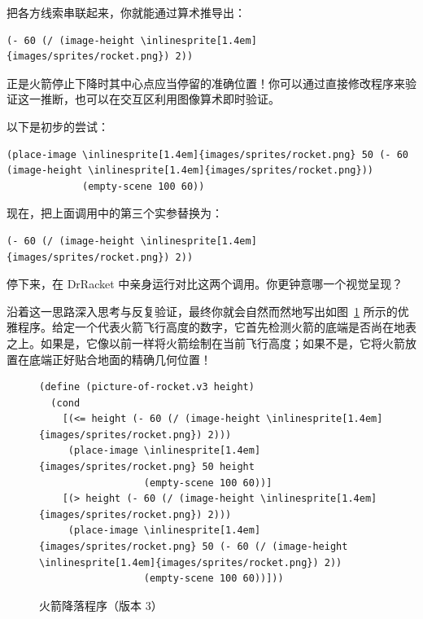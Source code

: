把各方线索串联起来，你就能通过算术推导出：

\begin{stepperbox}
\begin{Verbatim}[commandchars=\\\{\}, fontsize=\footnotesize]
(- 60 (/ (image-height \inlinesprite[1.4em]{images/sprites/rocket.png}) 2))
\end{Verbatim}
\end{stepperbox}

正是火箭停止下降时其中心点应当停留的准确位置！你可以通过直接修改程序来验证这一推断，也可以在交互区利用图像算术即时验证。

以下是初步的尝试：

\begin{stepperbox}
\begin{Verbatim}[commandchars=\\\{\}, fontsize=\footnotesize]
(place-image \inlinesprite[1.4em]{images/sprites/rocket.png} 50 (- 60 (image-height \inlinesprite[1.4em]{images/sprites/rocket.png}))
             (empty-scene 100 60))
\end{Verbatim}
\end{stepperbox}

现在，把上面调用中的第三个实参替换为：

\begin{stepperbox}
\begin{Verbatim}[commandchars=\\\{\}, fontsize=\footnotesize]
(- 60 (/ (image-height \inlinesprite[1.4em]{images/sprites/rocket.png}) 2))
\end{Verbatim}
\end{stepperbox}

\begin{notebox}[动手实验]
停下来，在 DrRacket 中亲身运行对比这两个调用。你更钟意哪一个视觉呈现？
\end{notebox}

沿着这一思路深入思考与反复验证，最终你就会自然而然地写出如图~\ref{fig:rocket_v3} 所示的优雅程序。给定一个代表火箭飞行高度的数字，它首先检测火箭的底端是否尚在地表之上。如果是，它像以前一样将火箭绘制在当前飞行高度；如果不是，它将火箭放置在底端正好贴合地面的精确几何位置！

\begin{figure}[htbp]
  \centering
\begin{stepperbox}[unbreakable]
\begin{Verbatim}[commandchars=\\\{\}, fontsize=\scriptsize]
(define (picture-of-rocket.v3 height)
  (cond
    [(<= height (- 60 (/ (image-height \inlinesprite[1.4em]{images/sprites/rocket.png}) 2)))
     (place-image \inlinesprite[1.4em]{images/sprites/rocket.png} 50 height
                  (empty-scene 100 60))]
    [(> height (- 60 (/ (image-height \inlinesprite[1.4em]{images/sprites/rocket.png}) 2)))
     (place-image \inlinesprite[1.4em]{images/sprites/rocket.png} 50 (- 60 (/ (image-height \inlinesprite[1.4em]{images/sprites/rocket.png}) 2))
                  (empty-scene 100 60))]))
\end{Verbatim}
\end{stepperbox}
  \caption{火箭降落程序（版本 3）}
  \label{fig:rocket_v3}
\end{figure}


